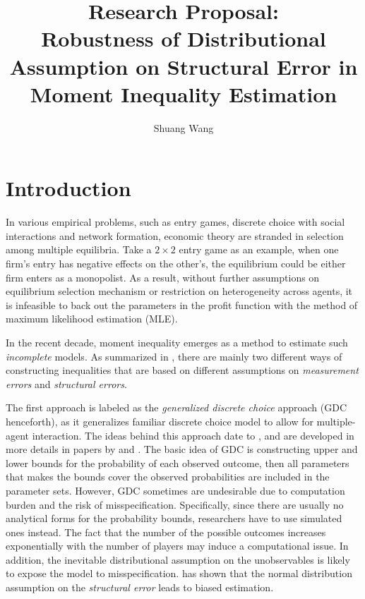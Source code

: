 \documentclass[draft]{article}
\title{Research Proposal:\\
Robustness of Distributional Assumption on Structural Error in Moment Inequality Estimation}
\author{Shuang Wang}
\begin{document}
\maketitle



\section{Introduction}


In various empirical problems, such as entry games, discrete choice with social interactions and network formation, economic theory are stranded in selection among multiple equilibria. Take a $2\times2$ entry game as an example, when one firm's entry has negative effects on the other's, the equilibrium could be either firm enters as a monopolist. As a result, without further assumptions on equilibrium selection mechanism or restriction on heterogeneity across agents, it is infeasible to back out the parameters in the profit function with the method of maximum likelihood estimation (MLE).

In the recent decade, moment inequality emerges as a method to estimate such \textit{incomplete} models. As summarized in \cite{pakes2010alternative}, there are mainly two different ways of constructing inequalities that are based on different assumptions on \textit{measurement errors} and \textit{structural errors}. 

The first approach is labeled as the \textit{generalized discrete choice} approach (GDC henceforth), as it generalizes familiar discrete choice model to allow for multiple-agent interaction. The ideas behind this approach date to \cite{tamer2003incomplete}, and are developed in more details in papers by \cite{ciliberto2009market} and \cite{andrews2004confidence}. The basic idea of GDC is constructing upper and lower bounds for the probability of each observed outcome, then all parameters that makes the bounds cover the observed probabilities are included in the parameter sets. However, GDC sometimes are undesirable due to computation burden and the risk of misspecification. Specifically, since there are usually no analytical forms for the probability bounds, researchers have to use simulated ones instead. The fact that the number of the possible outcomes increases exponentially with the number of players may induce a computational issue. In addition, the inevitable distributional assumption on the unobservables is likely to expose the model to misspecification. \cite{pakes2010alternative} has shown that the normal distribution assumption on the \textit{structural error} leads to biased estimation.
\end{document}

